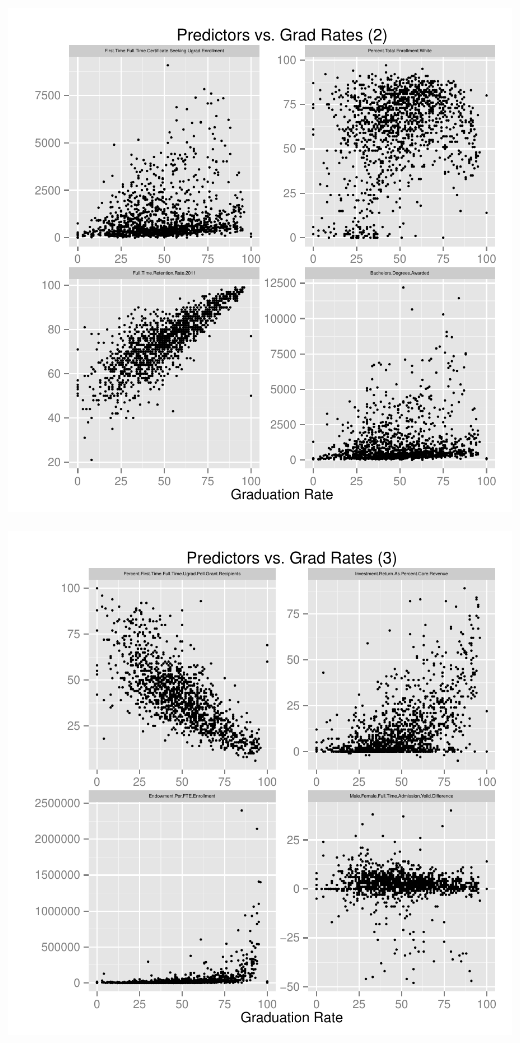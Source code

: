\documentclass{article}
\begin{document}
\includegraphics{Fig-scatter2}

\includegraphics{Fig-scatter3}
\end{document}
